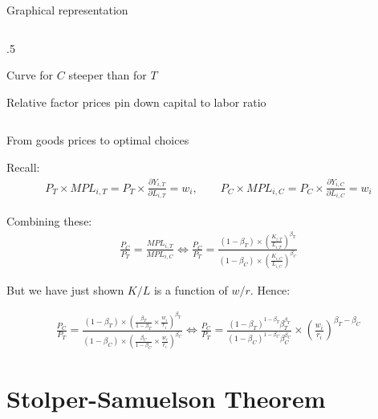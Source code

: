 \documentclass[notes,11pt, aspectratio=169, xcolor=table]{beamer}
\newenvironment{wideitemize}{\itemize\addtolength{\itemsep}{10pt}}{\enditemize}
\begin{document}
\begin{frame}{Graphical representation}
\begin{columns}[T]
\begin{column}{.5\textwidth}
\begin{wideitemize}
    \item Curve for $C$ steeper than for $T$

    \item Relative factor prices pin down capital to labor ratio
    \end{wideitemize}
    


    \end{column}
\end{columns}
\end{frame}

\begin{frame}{From goods prices to optimal choices}

        \begin{wideitemize}
            \item Recall:
                \begin{eqnarray*}
            P_T \times MPL_{i,T} =  P_T \times  \frac{\partial Y_{i,T}}{\partial L_{i,T}} = w_{i}, \qquad P_C \times MPL_{i,C} = P_C \times  \frac{\partial Y_{i,C}}{\partial L_{i,C}} = w_{i}
        \end{eqnarray*}

            \item<2-> Combining these:
\begin{eqnarray*}
    \frac{P_C}{P_T} = \frac{MPL_{i,T}}{MPL_{i,C}} \iff 
    \frac{P_C}{P_T} = \frac{(1-\beta_T) \times \left( \frac{K_{i,T}}{L_{i,T}} \right)^{\beta_T}}{ (1-\beta_C) \times \left( \frac{K_{i,C}}{L_{i,C}} \right)^{\beta_C}}  
\end{eqnarray*}

                \item<3-> But we have just shown $K/L$ is a function of $w/r$. Hence:
                
\begin{eqnarray*}\label{eq: goods-factor-prices}
    \frac{P_C}{P_T} = \frac{(1-\beta_T) \times \left( \frac{\beta_T}{1-\beta_T} \times \frac{w_i}{r_i}  \right)^{\beta_T}}{ (1-\beta_C) \times \left( \frac{\beta_C}{1-\beta_C} \times \frac{w_i}{r_i} \right)^{\beta_C}} \iff \frac{P_C}{P_T} = \frac{(1-\beta_T)^{1-\beta_T} \beta_T^{\beta_T}}{ (1-\beta_C)^{1-\beta_C} \beta_C^{\beta_C} } \times \left(  \frac{w_i}{r_i} \right)^{\beta_T - \beta_C}
\end{eqnarray*} 


\end{wideitemize}
\end{frame}

\section{Stolper-Samuelson Theorem}
\end{document}

